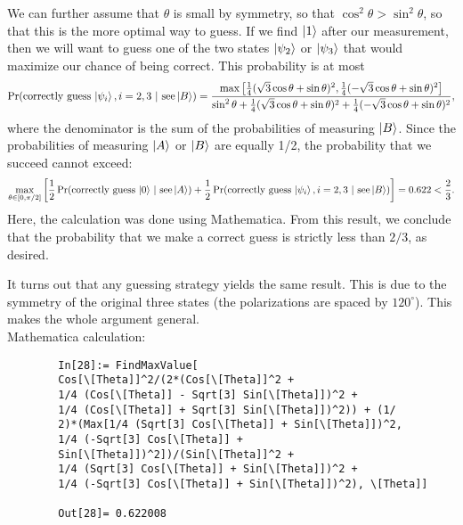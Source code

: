 \documentclass{article}
\theoremstyle{definition}
\newcommand{\f}[2]{\frac{#1}{#2}}
\newcommand{\lb}{\left[}
\newcommand{\rb}{\right]}
\begin{document}
\begin{enumerate}[label=(\alph*)]
	
	We can further assume that $\theta$ is small by symmetry, so that $\cos^2\theta > \sin^2\theta$, so that this is the more optimal way to guess. If we find $\ket{1}$ after our measurement, then we will want to guess one of the two states $\ket{\psi_2}$ or $\ket{\psi_3}$ that would maximize our chance of being correct. This probability is at most
	\begin{align*}
		\Pr(\text{correctly guess $\ket{\psi_i}, i = 2,3$}\,\, | \,\, \text{see} \ket{B}) =
		\f{\max\lb \f{1}{4}(\sqrt{3}\cos\theta + \sin\theta)^2 , \f{1}{4}(-\sqrt{3}\cos\theta + \sin\theta)^2\rb}{\sin^2\theta + \f{1}{4}(\sqrt{3}\cos\theta + \sin\theta)^2 + \f{1}{4}(-\sqrt{3}\cos\theta + \sin\theta)^2},
	\end{align*}
	where the denominator is the sum of the probabilities of measuring $\ket{B}$. Since the probabilities of measuring $\ket{A}$ or $\ket{B}$ are equally 1/2, the probability that we succeed cannot exceed:
	\begin{align*}
		\max_{\theta\in [0,\pi/2]}\lb \f{1}{2}\Pr(\text{correctly guess $\ket{0}$}\,\, | \,\, \text{see} \ket{A}) + \f{1}{2}	\Pr(\text{correctly guess $\ket{\psi_i}, i = 2,3$}\,\, | \,\, \text{see} \ket{B}) \rb = 0.622 < \f{2}{3}.
	\end{align*}
	Here, the calculation was done using Mathematica. From this result, we conclude that the probability that we make a correct guess is strictly less than $2/3$, as desired. 
	
	It turns out that any guessing strategy yields the same result. This is due to the symmetry of the original three states (the polarizations are spaced by $120^\circ$). This makes the whole argument general. \\
	
	
	Mathematica calculation:
	\begin{lstlisting}
		In[28]:= FindMaxValue[
		Cos[\[Theta]]^2/(2*(Cos[\[Theta]]^2 + 
		1/4 (Cos[\[Theta]] - Sqrt[3] Sin[\[Theta]])^2 + 
		1/4 (Cos[\[Theta]] + Sqrt[3] Sin[\[Theta]])^2)) + (1/
		2)*(Max[1/4 (Sqrt[3] Cos[\[Theta]] + Sin[\[Theta]])^2, 
		1/4 (-Sqrt[3] Cos[\[Theta]] + 
		Sin[\[Theta]])^2])/(Sin[\[Theta]]^2 + 
		1/4 (Sqrt[3] Cos[\[Theta]] + Sin[\[Theta]])^2 + 
		1/4 (-Sqrt[3] Cos[\[Theta]] + Sin[\[Theta]])^2), \[Theta]]
		
		Out[28]= 0.622008
	\end{lstlisting}
	



\end{enumerate}
\end{document}
